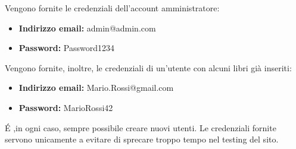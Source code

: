 Vengono fornite le credenziali dell'account amministratore:
\begin{itemize}
	\item \textbf{Indirizzo email:} admin@admin.com
	\item \textbf{Password:} Password1234
\end{itemize}

Vengono fornite, inoltre, le credenziali di un'utente con alcuni libri già inseriti:
\begin{itemize}
	\item \textbf{Indirizzo email:} Mario.Rossi@gmail.com
	\item \textbf{Password:} MarioRossi42
\end{itemize}

\'E ,in ogni caso, sempre possibile creare nuovi utenti. Le credenziali fornite servono unicamente a evitare di sprecare troppo tempo nel testing del sito.